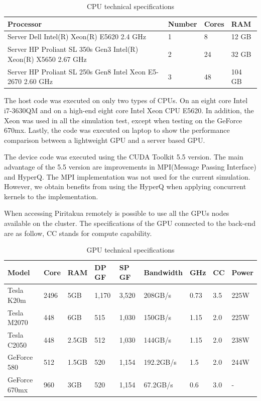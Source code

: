 \begin{table}[h]
\centering
\begin{tabular}{ | p{7.1cm}  | l | l | l |}
  \hline
  Processor & Number & Cores & RAM  \\
  \hline
  Server Dell Intel(R) Xeon(R) E5620 2.4 GHz & 1 & 8 & 12 GB \\
  \hline
  Server HP Proliant SL 350s Gen3 Intel(R) Xeon(R) X5650 2.67 GHz & 2 & 24 & 32 GB \\
  \hline
   Server HP Proliant SL 250s Gen8 Intel Xeon E5-2670 2.60 GHz & 3 & 48 & 104 GB \\
   \hline
  \end{tabular}
      \caption{CPU technical specifications}
  \label{tab:cpus}
  \end{table}

The host code was executed on only two types of CPUs. On an eight core Intel i7-3630QM and on a high-end eight core Intel Xeon CPU E5620. In addition, the Xeon was used in all the simulation test, except when testing on the GeForce 670mx. Lastly, the code was executed on laptop to show the performance comparison between a lightweight GPU and a server based GPU.

The device code was executed using the CUDA Toolkit 5.5 version. The main advantage of the 5.5 version are improvements in MPI(Message Passing Interface) and HyperQ. The MPI implementation was not used for the current simulation. However, we obtain benefits from using the HyperQ when applying concurrent kernels to the implementation. 

When accessing Piritakua remotely is possible to use all the GPUs nodes available on the cluster. The specifications of the GPU connected to the back-end are as follow, CC stands for compute capability.

\begin{table}[h]
\centering
  \begin{tabular}{ |  l  |  l  |  l  |  l  |  l  | l | l | l |l | }
    \hline
    Model & Core& RAM& DP GF& SP GF& Bandwidth& GHz& CC & Power\\
    \hline
    Tesla K20m & 2496 & 5GB & 1,170 & 3,520 & 208GB/s & 0.73 & 3.5 & 225W \\
   \hline
    Tesla M2070 & 448 & 6GB & 515 & 1,030 & 150GB/s & 1.15 &  2.0 & 225W\\
   \hline
     Tesla C2050 & 448 & 2.5GB & 512 & 1,030 & 144GB/s & 1.15  & 2.0 & 238W \\
   \hline
      GeForce 580 & 512 & 1.5GB & 520 & 1,154 & 192.2GB/s & 1.5 & 2.0 & 244W \\
   \hline
   GeForce 670mx & 960 & 3GB & 520 & 1,154 & 67.2GB/s & 0.6 & 3.0 &  - \\
   \hline
  \end{tabular}
    \caption{GPU technical specifications}
  \label{tab:gpus}
  \end{table}
  
